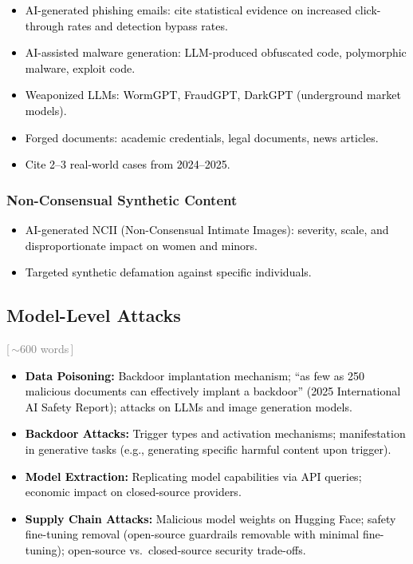 \documentclass[preprint,12pt]{elsarticle}
\newcommand{\wordcount}[1]{\hfill\textcolor{gray}{\small[\,#1\,]}}
\newcommand{\outline}[1]{\textcolor{black}{#1}}
\begin{document}
\outline{%
\begin{itemize}[nosep,leftmargin=1.5em]
    \item AI-generated phishing emails: cite statistical evidence on increased click-through rates and detection bypass rates.
    \item AI-assisted malware generation: LLM-produced obfuscated code, polymorphic malware, exploit code.
    \item Weaponized LLMs: WormGPT, FraudGPT, DarkGPT (underground market models).
    \item Forged documents: academic credentials, legal documents, news articles.
    \item Cite 2--3 real-world cases from 2024--2025.
\end{itemize}
}

\subsubsection{Non-Consensual Synthetic Content}

\outline{%
\begin{itemize}[nosep,leftmargin=1.5em]
    \item AI-generated NCII (Non-Consensual Intimate Images): severity, scale, and disproportionate impact on women and minors.
    \item Targeted synthetic defamation against specific individuals.
\end{itemize}
}


\subsection{Model-Level Attacks} \wordcount{$\sim$600 words}
\label{sec:threat-model}

\outline{%
\begin{itemize}[nosep,leftmargin=1.5em]
    \item \textbf{Data Poisoning:} Backdoor implantation mechanism; ``as few as 250 malicious documents can effectively implant a backdoor'' (2025 International AI Safety Report); attacks on LLMs and image generation models.
    \item \textbf{Backdoor Attacks:} Trigger types and activation mechanisms; manifestation in generative tasks (e.g., generating specific harmful content upon trigger).
    \item \textbf{Model Extraction:} Replicating model capabilities via API queries; economic impact on closed-source providers.
    \item \textbf{Supply Chain Attacks:} Malicious model weights on Hugging Face; safety fine-tuning removal (open-source guardrails removable with minimal fine-tuning); open-source vs.\ closed-source security trade-offs.
\end{itemize}
}
\end{document}
